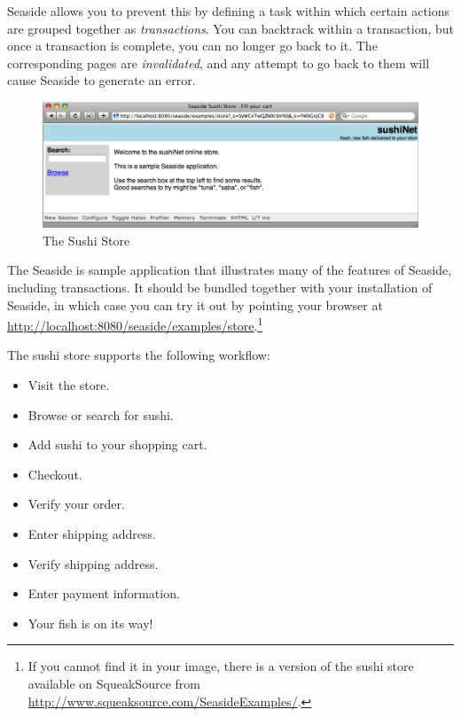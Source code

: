 \documentclass[a4paper,10pt,twoside]{book}
\begin{document}
Seaside allows you to prevent this by defining a task within which certain actions are grouped together as \emph{transactions}.
You can backtrack within a transaction, but once a transaction is complete, you can no longer go back to it.
The corresponding pages are \emph{invalidated}, and any attempt to go back to them will cause Seaside to generate an error.

\begin{figure}[ht]
\begin{center}
\includegraphics[width=\textwidth]{sushiStore}
\caption{The Sushi Store}
\label{fig:sushiStore}
\end{center}
\end{figure}

The Seaside  is sample application that illustrates many of the features of Seaside, including transactions.
It should be bundled together with your installation of Seaside, in which case you can try it out by pointing your browser at
\url{http://localhost:8080/seaside/examples/store}.\footnote{If you cannot find it in your image, there is a version of the sushi store available on SqueakSource from \url{http://www.squeaksource.com/SeasideExamples/}.}

The sushi store supports the following workflow:
\begin{itemize}
  \item Visit the store.
  \item Browse or search for sushi.
  \item Add sushi to your shopping cart.
  \item Checkout.
  \item Verify your order.
  \item Enter shipping address.
  \item Verify shipping address.
  \item Enter payment information.
  \item Your fish is on its way!
\end{itemize}
\end{document}
